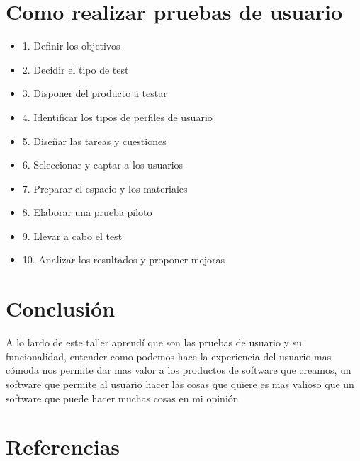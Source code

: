 \documentclass[11pt]{article}
\begin{document}
\section{Como realizar pruebas de usuario}
\label{sec:org87fdab6}
\autocite{Abizanda_2023}

\begin{itemize}
\item 1. Definir los objetivos
\item 2. Decidir el tipo de test
\item 3. Disponer del producto a testar
\item 4. Identificar los tipos de perfiles de usuario
\item 5. Diseñar las tareas y cuestiones
\item 6. Seleccionar y captar a los usuarios
\item 7. Preparar el espacio y los materiales
\item 8. Elaborar una prueba piloto
\item 9. Llevar a cabo el test
\item 10. Analizar los resultados y proponer mejoras
\end{itemize}

\section{Conclusión}
\label{sec:org394a181}
A lo lardo de este taller aprendí que son las pruebas de usuario y su 
funcionalidad, entender como podemos hace la experiencia del usuario mas cómoda 
nos permite dar mas valor a los productos de software que creamos, un software
que permite al usuario hacer las cosas que quiere es mas valioso que un software
que puede hacer muchas cosas en mi opinión

\section{Referencias}
\label{sec:orga22145e}
\printbibliography[heading=none]
\end{document}
